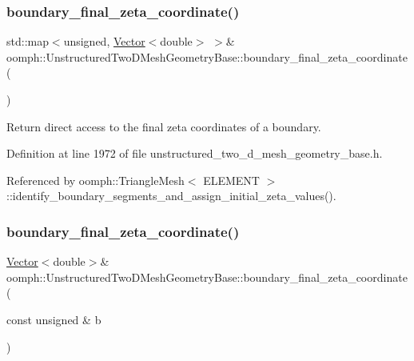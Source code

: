 \subsubsection{\texorpdfstring{boundary\+\_\+final\+\_\+zeta\+\_\+coordinate()}{boundary\_final\_zeta\_coordinate()}\hspace{0.1cm}{\footnotesize\ttfamily [1/2]}}
{\footnotesize\ttfamily std\+::map$<$unsigned, \hyperlink{classoomph_1_1Vector}{Vector}$<$double$>$ $>$\& oomph\+::\+Unstructured\+Two\+D\+Mesh\+Geometry\+Base\+::boundary\+\_\+final\+\_\+zeta\+\_\+coordinate (\begin{DoxyParamCaption}{ }\end{DoxyParamCaption})\hspace{0.3cm}{\ttfamily [inline]}}



Return direct access to the final zeta coordinates of a boundary. 



Definition at line 1972 of file unstructured\+\_\+two\+\_\+d\+\_\+mesh\+\_\+geometry\+\_\+base.\+h.



Referenced by oomph\+::\+Triangle\+Mesh$<$ E\+L\+E\+M\+E\+N\+T $>$\+::identify\+\_\+boundary\+\_\+segments\+\_\+and\+\_\+assign\+\_\+initial\+\_\+zeta\+\_\+values().

\mbox{\label{classoomph_1_1UnstructuredTwoDMeshGeometryBase_a261c52001f2bddc41821162ed5ccfe77}} 
\subsubsection{\texorpdfstring{boundary\+\_\+final\+\_\+zeta\+\_\+coordinate()}{boundary\_final\_zeta\_coordinate()}\hspace{0.1cm}{\footnotesize\ttfamily [2/2]}}
{\footnotesize\ttfamily \hyperlink{classoomph_1_1Vector}{Vector}$<$double$>$\& oomph\+::\+Unstructured\+Two\+D\+Mesh\+Geometry\+Base\+::boundary\+\_\+final\+\_\+zeta\+\_\+coordinate (\begin{DoxyParamCaption}\item[{const unsigned \&}]{b }\end{DoxyParamCaption})\hspace{0.3cm}{\ttfamily [inline]}}



